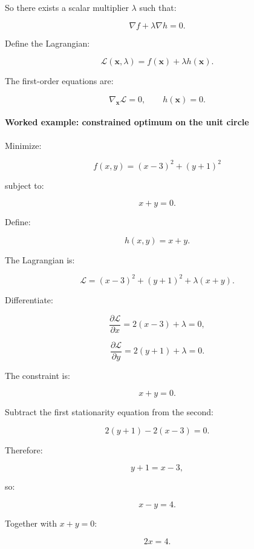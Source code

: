 So there exists a scalar multiplier \(\lambda\) such that:

\[
\boxed{ \nabla f+\lambda\nabla h=0 }.
\]

Define the Lagrangian:

\[
\boxed{ \mathcal L(\mathbf x,\lambda) = f(\mathbf x)+\lambda h(\mathbf x) }.
\]

The first-order equations are:

\[
\nabla_{\mathbf x}\mathcal L=0, \qquad h(\mathbf x)=0.
\]

\begin{allmightroleexample}

\paragraph{Worked example: constrained optimum on the unit circle}\label{02-foundations-ii-ch026-worked-example-constrained-optimum-on-the-unit-circle}

\hypertarget{02-foundations-ii-ch026-worked-example-constrained-optimum-on-the-unit-circle}{}

Minimize:

\end{allmightroleexample}

\[
f(x,y)=(x-3)^2+(y+1)^2
\]

subject to:

\[
x+y=0.
\]

Define:

\[
h(x,y)=x+y.
\]

The Lagrangian is:

\[
\mathcal L= (x-3)^2+(y+1)^2+\lambda(x+y).
\]

Differentiate:

\[
\frac{\partial\mathcal L}{\partial x} = 2(x-3)+\lambda=0,
\]

\[
\frac{\partial\mathcal L}{\partial y} = 2(y+1)+\lambda=0.
\]

The constraint is:

\[
x+y=0.
\]

Subtract the first stationarity equation from the second:

\[
2(y+1)-2(x-3)=0.
\]

Therefore:

\[
y+1=x-3,
\]

so:

\[
x-y=4.
\]

Together with \(x+y=0\):

\[
2x=4.
\]

